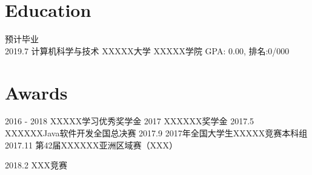\documentclass[letterpaper,UTF8]{twentysecondcv} %
\begin{document}
\makeprofile %

\section{Education}

\begin{twenty} %
	\twentyitem
    	{预计毕业 \\ 2019.7}
        {计算机科学与技术}
        {}
        {XXXXX大学 XXXXX学院}
        {GPA: 0.00, 排名:0/000}
\end{twenty}


\section{Awards}
\begin{twenty}
	\twentyitem
    	{2016 - 2018}
        {XXXXX学习优秀奖学金}
        {\textbf{{}}}
        {}
        {}
    \twentyitem
        {2017}
        {XXXXXX奖学金}
        {\textbf{{}}}
        {}
        {}
    \twentyitem
        {2017.5}
        {XXXXXXJava软件开发全国总决赛}
        {\textbf{{}}}
        {}
        {}
    \twentyitem
        {2017.9}
        {2017年全国大学生XXXXX竞赛本科组}
        {\textbf{{}}}
        {}
        {}
    \twentyitem
        {2017.11}
        {第42届XXXXXX亚洲区域赛（XXX）}
        {\textbf{{}}}
        {}
        {}

    \twentyitem
        {2018.2}
        {XXX竞赛}
        {\textbf{{}}}
        {}
        {}


\end{twenty}

\end{document}
